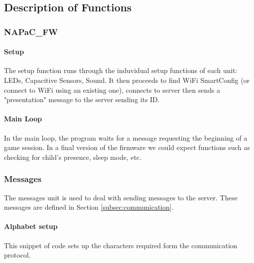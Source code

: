 \subsection{Description of Functions}

\subsubsection{NAPaC\_FW}

\paragraph{Setup}
The setup function runs through the induvidual setup functions of each unit: LEDs, Capacitive Sensors, Sound. It then proceeds to find WiFi SmartConfig (or connect to WiFi using an existing one), connects to server then sends a "presentation" message to the server sending its ID.



\paragraph{Main Loop}
In the main loop, the program waits for a message requesting the beginning of a game session. In a final version of the firmware we could expect functions such as checking for child's presence, sleep mode, etc. 



\subsubsection{Messages}
The messages unit is used to deal with sending messages to the server. These messages are defined in Section \ref{subsec:communication}. 

\paragraph{Alphabet setup}
This snippet of code sets up the characters required form the communication protocol. 



